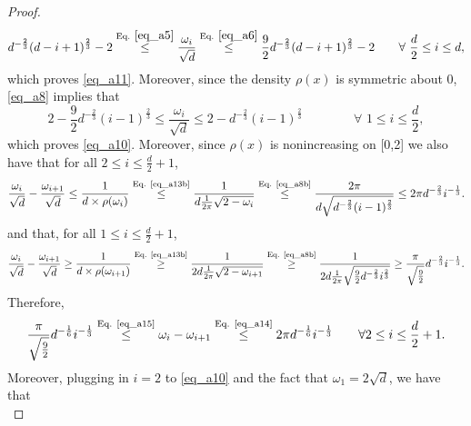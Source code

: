 \documentclass[11pt,letterpaper]{article}
\begin{document}
\begin{proof}
\begin{equation}\label{eq_a8}
d^{-\frac{2}{3}} (d-i+1)^{\frac{2}{3}}  -2 \stackrel{\textrm{Eq. } \eqref{eq_a5}}{\leq} \frac{\omega_{i}}{\sqrt{d}} \stackrel{\textrm{Eq. } \eqref{eq_a6}}{\leq} \frac{9}{2}d^{-\frac{2}{3}} (d-i+1)^{\frac{2}{3}} -2 \qquad \forall \, \,  \frac{d}{2} \leq i \leq d ,
\end{equation}
%
which proves \eqref{eq_a11}.
%
Moreover, since the density $\rho(x)$ is symmetric about $0$, \eqref{eq_a8} implies that
%
\begin{equation} \label{eq_a8b}
2-  \frac{9}{2}d^{-\frac{2}{3}} (i-1)^{\frac{2}{3}}   \leq \frac{\omega_i}{\sqrt{d}} \leq 2- d^{-\frac{2}{3}} (i-1)^{\frac{2}{3}}\qquad \qquad \forall \, \,   1\leq i \leq \frac{d}{2},
\end{equation}
%
which proves \eqref{eq_a10}.
%
%
Moreover, since $\rho(x)$ is nonincreasing  on [0,2] we  also have that for all $2\leq i \leq \frac{d}{2} +1$,
%
\begin{equation} \label{eq_a14}
    \frac{\omega_i}{\sqrt{d}} - \frac{\omega_{i+1}}{\sqrt{d}} \leq \frac{1}{d\times \rho(\omega_{i})} \stackrel{\textrm{Eq. \eqref{eq_a13b}}}{\leq} \frac{1}{d     \frac{1}{2\pi} \sqrt{2-\omega_{i}}} \stackrel{\textrm{Eq. \eqref{eq_a8b}}}{\leq}  \frac{2  \pi}{d\sqrt{   d^{-\frac{2}{3}} (i-1)^{\frac{2}{3}}}} \leq 2 \pi d^{-\frac{2}{3}}i^{-\frac{1}{3}}.
\end{equation}
%
and that, for all $1\leq i \leq \frac{d}{2} +1$,
%
\begin{equation} \label{eq_a15}
    \frac{\omega_i}{\sqrt{d}} - \frac{\omega_{i+1}}{\sqrt{d}} \geq \frac{1}{d\times \rho(\omega_{i+1})} \stackrel{\textrm{Eq. \eqref{eq_a13b}}}{\geq} \frac{1}{2d     \frac{1}{2\pi} \sqrt{2-\omega_{i+1}}} \stackrel{\textrm{Eq. \eqref{eq_a8b}}}{\geq}  \frac{1}{2d     \frac{1}{2\pi} \sqrt{     \frac{9}{2}d^{-\frac{2}{3}} i^{\frac{2}{3}}}} \geq \frac{\pi}{\sqrt{ \frac{9}{2}}} d^{-\frac{2}{3}}i^{-\frac{1}{3}}.
\end{equation}
%
Therefore,
\begin{equation}\label{eq_a9}
\frac{\pi}{\sqrt{ \frac{9}{2}}} d^{-\frac{1}{6}}i^{-\frac{1}{3}} \stackrel{\textrm{Eq. \eqref{eq_a15}}}{\leq} \omega_i - \omega_{i+1} \stackrel{\textrm{Eq. \eqref{eq_a14}}}{\leq} 2 \pi d^{-\frac{1}{6}}i^{-\frac{1}{3}} \qquad \forall 2\leq i \leq \frac{d}{2} +1.
\end{equation}
%
Moreover, plugging in $i=2$ to \eqref{eq_a10} and the fact that $\omega_1 = 2\sqrt{d}$, we have that
%
\begin{equation}\label{eq_a10b}

\end{equation}
\end{proof}
\end{document}

